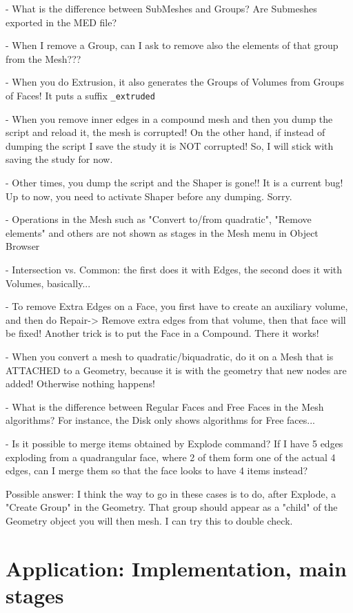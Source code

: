 \documentclass[10pt]{book}
\begin{document}
- What is the difference between SubMeshes and Groups? Are Submeshes exported in the MED file?

- When I remove a Group, can I ask to remove also the elements of that group from the Mesh???

- When you do Extrusion, it also generates the Groups of Volumes from Groups of Faces! It puts a suffix \verb|_extruded|

- When you remove inner edges in a compound mesh and then you dump the script and reload it, the mesh is corrupted! 
On the other hand, if instead of dumping the script I save the study it is NOT corrupted! So, I will stick with saving the study for now.

- Other times, you dump the script and the Shaper is gone!! It is a current bug! Up to now, you need to activate Shaper before any dumping. Sorry.

- Operations in the Mesh such as "Convert to/from quadratic", "Remove elements" and others
  are not shown as stages in the Mesh menu in Object Browser

- Intersection vs. Common: the first does it with Edges, the second does it with Volumes, basically...

- To remove Extra Edges on a Face, you first have to create an auxiliary volume, and then do Repair-> Remove extra edges from that volume,
  then that face will be fixed!
  Another trick is to put the Face in a Compound. There it works!

- When you convert a mesh to quadratic/biquadratic, do it on a Mesh that is ATTACHED to a Geometry, because it is with the geometry that new nodes are added! 
  Otherwise nothing happens!

- What is the difference between Regular Faces and Free Faces in the Mesh algorithms? For instance, the Disk only shows algorithms for Free faces...

- Is it possible to merge items obtained by Explode command? If I have 5 edges exploding from a quadrangular face,
  where 2 of them form one of the actual 4 edges, can I merge them so that the face looks to have 4 items instead?
    
  Possible answer: I think the way to go in these cases is to do, after Explode, a "Create Group" in the Geometry.
    That group should appear as a "child" of the Geometry object you will then mesh. I can try this to double check.



\part{Application: Implementation, main stages}
\end{document}

